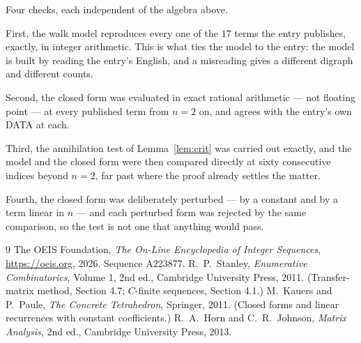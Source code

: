 \documentclass[11pt,a4paper]{article}
\theoremstyle{plain}
\theoremstyle{definition}
\begin{document}
Four checks, each independent of the algebra above.

First, the walk model reproduces every one of the $17$ terms the entry publishes,
exactly, in integer arithmetic. This is what ties the model to the entry: the model is built
by reading the entry's English, and a misreading gives a different digraph and different
counts.

Second, the closed form was evaluated in exact rational arithmetic --- not floating point ---
at every published term from $n=2$ on, and agrees with the entry's own DATA at each.

Third, the annihilation test of Lemma~\ref{lem:crit} was carried out exactly, and the model
and the closed form were then compared directly at sixty consecutive indices beyond
$n=2$, far past where the proof already settles the matter.

Fourth, the closed form was deliberately perturbed --- by a constant and by a term linear in
$n$ --- and each perturbed form was rejected by the same comparison, so the test is not one
that anything would pass.

\begin{thebibliography}{9}
 The OEIS Foundation, \emph{The On-Line Encyclopedia of Integer
Sequences}, \url{https://oeis.org}, 2026. Sequence A223877.
 R.~P.~Stanley, \emph{Enumerative Combinatorics}, Volume 1, 2nd ed.,
Cambridge University Press, 2011. (Transfer-matrix method, Section 4.7; $C$-finite sequences,
Section 4.1.)
 M.~Kauers and P.~Paule, \emph{The Concrete Tetrahedron}, Springer, 2011.
(Closed forms and linear recurrences with constant coefficients.)
 R.~A.~Horn and C.~R.~Johnson, \emph{Matrix Analysis}, 2nd ed., Cambridge
University Press, 2013.
\end{thebibliography}
\end{document}

